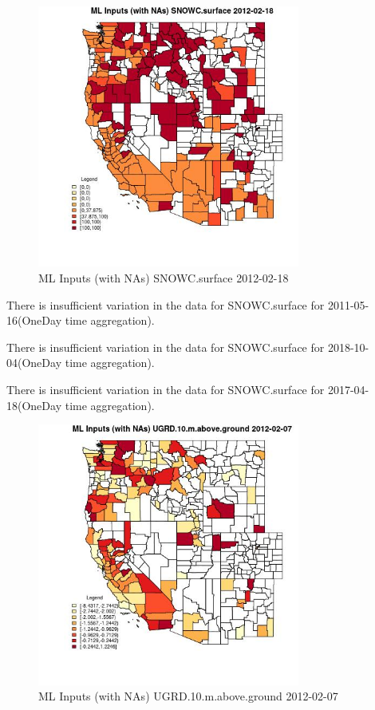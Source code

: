 \begin{figure} 
\centering  
\includegraphics[width=0.77\textwidth]{Code_Outputs/Report_ML_input_PM25_Step4_part_f_de_duplicated_aves_prioritize_24hr_obswNAs_CountySNOWCsurfaceMean2012-02-18.jpg} 
\caption{\label{fig:Report_ML_input_PM25_Step4_part_f_de_duplicated_aves_prioritize_24hr_obswNAsCountySNOWCsurfaceMean2012-02-18}ML Inputs (with NAs) SNOWC.surface 2012-02-18} 
\end{figure} 
 

There is insufficient variation in the data for SNOWC.surface for 2011-05-16(OneDay time aggregation). 
 

There is insufficient variation in the data for SNOWC.surface for 2018-10-04(OneDay time aggregation). 
 

There is insufficient variation in the data for SNOWC.surface for 2017-04-18(OneDay time aggregation). 
 

\begin{figure} 
\centering  
\includegraphics[width=0.77\textwidth]{Code_Outputs/Report_ML_input_PM25_Step4_part_f_de_duplicated_aves_prioritize_24hr_obswNAs_CountyUGRD10mabovegroundMean2012-02-07.jpg} 
\caption{\label{fig:Report_ML_input_PM25_Step4_part_f_de_duplicated_aves_prioritize_24hr_obswNAsCountyUGRD10mabovegroundMean2012-02-07}ML Inputs (with NAs) UGRD.10.m.above.ground 2012-02-07} 
\end{figure} 
 

